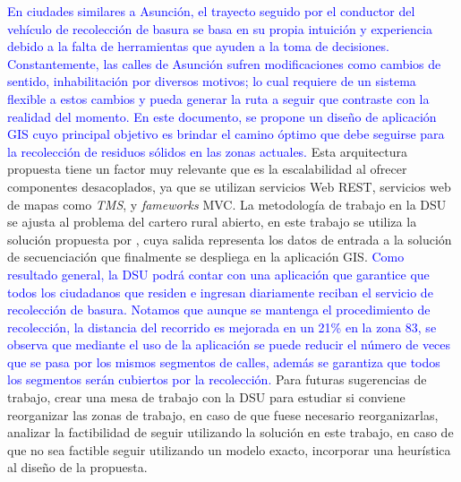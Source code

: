 \documentclass[spanish, conference]{IEEEtran}
\begin{document}
{\textcolor{blue}{En ciudades similares a Asunción, el trayecto seguido por el conductor del vehículo de recolección de basura se basa en su propia intuición y experiencia debido a la falta de herramientas que ayuden a la toma de decisiones. Constantemente, las calles de Asunción sufren modificaciones como cambios de sentido, inhabilitación por diversos motivos; lo cual requiere de un sistema flexible a estos cambios y pueda generar la ruta a seguir que contraste con la realidad del momento. En este documento, se propone un diseño de aplicación GIS cuyo principal objetivo es brindar el camino óptimo que debe seguirse para la recolección de residuos sólidos en las zonas actuales.}
Esta arquitectura propuesta tiene un factor muy relevante que es la escalabilidad al ofrecer componentes desacoplados, ya que se utilizan servicios Web REST, servicios web de mapas como \textit{TMS}, y \textit{fameworks} MVC. La metodología de trabajo en la DSU se ajusta al problema del cartero rural abierto, en este trabajo se utiliza la solución propuesta por \cite{Braier2017AnArgentina}, cuya salida representa los datos de entrada a la solución de secuenciación que finalmente se despliega en la aplicación GIS.
\textcolor{blue}{Como resultado general, la DSU podrá contar con una aplicación que garantice que todos los ciudadanos que residen e ingresan diariamente reciban el servicio de recolección de basura. Notamos que aunque se mantenga el procedimiento de recolección, la distancia del recorrido es mejorada en un 21\% en la zona 83, se observa que mediante el uso de la aplicación se puede reducir el número de veces que se pasa por los mismos segmentos de calles, además se garantiza que todos los segmentos serán cubiertos por la recolección.}
Para futuras sugerencias de trabajo, crear una mesa de trabajo con la DSU para estudiar si conviene reorganizar las zonas de trabajo, en caso de que fuese necesario reorganizarlas, analizar la factibilidad de seguir utilizando la solución en este trabajo, en caso de que no sea factible seguir utilizando un modelo exacto, incorporar una heurística al diseño de la propuesta.



}
\end{document}
